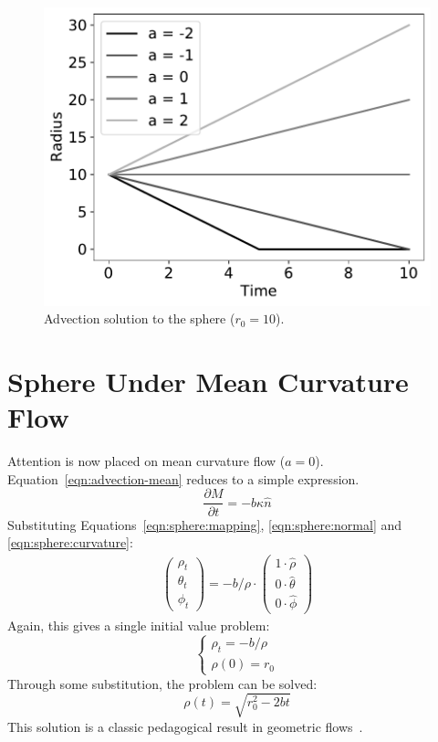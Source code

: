 \documentclass[journal]{IEEEtran}
\begin{document}
\begin{figure}[t]
  \centering
    \includegraphics[width=0.9\linewidth]{advection}%
  \caption{Advection solution to the sphere ($r_0 = 10$).}
  \label{fig:advection}
\end{figure}

\section{Sphere Under Mean Curvature Flow}
\label{sec:meanflow}
Attention is now placed on mean curvature flow ($a = 0$).
Equation~\ref{eqn:advection-mean} reduces to a simple expression.
\begin{equation}
  \label{eqn:mean}
  \frac{\partial M}{\partial t} = -b \kappa \hat{n}
\end{equation}
Substituting Equations~\ref{eqn:sphere:mapping}, \ref{eqn:sphere:normal} and \ref{eqn:sphere:curvature}:
\begin{align}
  \begin{pmatrix}
    \rho_t \\
    \theta_t \\
    \phi_t
  \end{pmatrix} = -b / \rho \cdot
  \begin{pmatrix}
    1 \cdot \hat{\rho} \\
    0 \cdot \hat{\theta} \\
    0 \cdot \hat{\phi}
  \end{pmatrix}
\end{align}
Again, this gives a single initial value problem:
\begin{equation}
  \left\{
    \begin{array}{ll}
      \rho_t = -b/\rho\\
      \rho(0) = r_0
    \end{array}
  \right.
\end{equation}
Through some substitution, the problem can be solved:
\begin{equation}
  \label{eqn:mean:solution}
  \rho(t) = \sqrt{r_0^2 - 2bt}
\end{equation}
This solution is a classic pedagogical result in geometric flows~\cite{bellettini2014lecture}.
\end{document}
